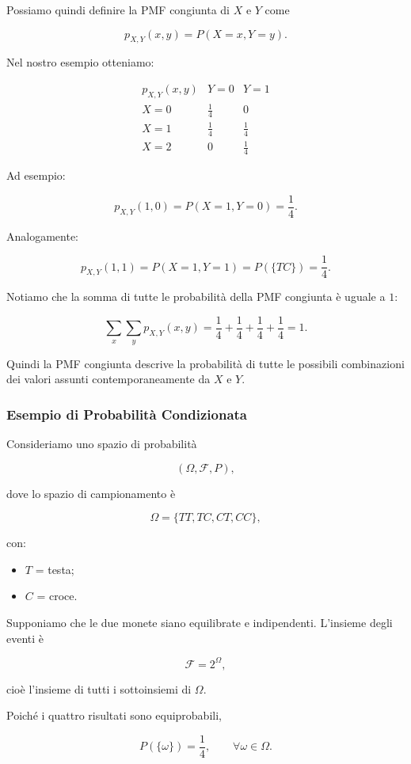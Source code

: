 Possiamo quindi definire la PMF congiunta di $X$ e $Y$ come

$$
p_{X,Y}(x,y)
=
P(X=x,Y=y).
$$

Nel nostro esempio otteniamo:

$$
\begin{array}{c|cc}
p_{X,Y}(x,y) & Y=0 & Y=1\\
\hline
X=0 & \frac14 & 0\\
X=1 & \frac14 & \frac14\\
X=2 & 0 & \frac14
\end{array}
$$

Ad esempio:

$$
p_{X,Y}(1,0)
=
P(X=1,Y=0)
=
\frac14.
$$

Analogamente:

$$
p_{X,Y}(1,1)
=
P(X=1,Y=1)
=
P(\{TC\})
=
\frac14.
$$

Notiamo che la somma di tutte le probabilità della PMF congiunta è uguale a $1$:

$$
\sum_x\sum_y p_{X,Y}(x,y)
=
\frac14+\frac14+\frac14+\frac14
=
1.
$$

Quindi la PMF congiunta descrive la probabilità di tutte le possibili combinazioni dei valori assunti contemporaneamente da $X$ e $Y$.



\subsubsection{Esempio di Probabilità Condizionata}

Consideriamo uno spazio di probabilità

\[
(\Omega,\mathcal{F},P),
\]

dove lo spazio di campionamento è

\[
\Omega=\{TT,TC,CT,CC\},
\]

con:
\begin{itemize}
    \item $T$ = testa;
    \item $C$ = croce.
\end{itemize}

Supponiamo che le due monete siano equilibrate e indipendenti. 
L'insieme degli eventi è

\[
\mathcal{F}=2^\Omega,
\]

cioè l'insieme di tutti i sottoinsiemi di $\Omega$.

Poiché i quattro risultati sono equiprobabili,

\[
P(\{\omega\})=\frac14,
\qquad \forall \omega\in\Omega.
\]

